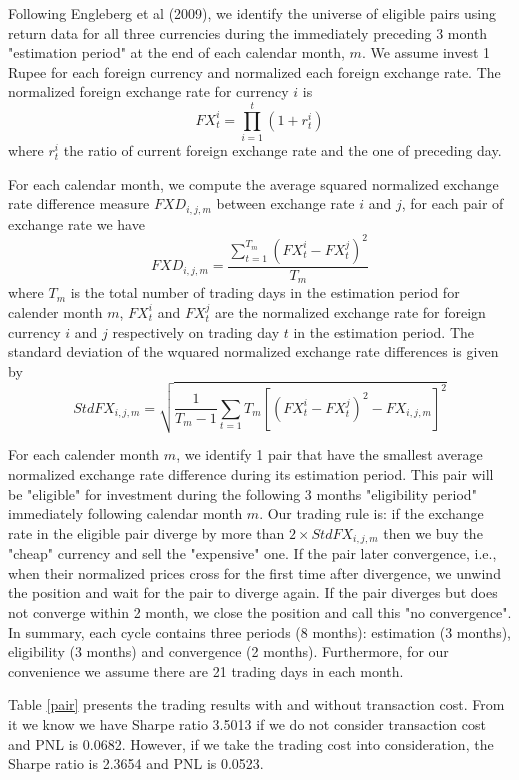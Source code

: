 \documentclass[11pt]{article}
\begin{document}
Following Engleberg et al (2009), we identify the universe of eligible pairs using return data for all three currencies during the immediately preceding 3 month "estimation period" at the end of each calendar month, $m$.  We assume invest 1 Rupee for each foreign currency and normalized each foreign exchange rate. The normalized foreign exchange rate  for currency $i$ is
\[
FX_t^i =\prod_{i=1}^t(1+r_t^i)
\]
where $r_t^i$ the ratio of current foreign exchange rate and the one of preceding day.

For each calendar month, we compute the average squared normalized exchange rate difference measure $FXD_{i,j,m}$ between exchange rate $i$ and $j$, for each pair of exchange rate we have
\[
FXD_{i,j,m}=\frac{\sum_{t=1}^{T_m}(FX_{t}^i-FX_{t}^j)^2}{T_m}
\]
where $T_m$ is the total number of trading days in the estimation period for calender month $m$, $FX_{t}^i$ and $FX_t^{j}$ are the normalized exchange rate for foreign currency $i$ and $j$ respectively on trading day $t$ in the estimation period. The standard deviation of the wquared normalized exchange rate differences is given by
\[
StdFX_{i,j,m}=\sqrt{\frac{1}{T_m-1}\sum_{t=1}{T_m}\left [(FX_t^i-FX_t^j)^2-FX_{i,j,m}\right]^2}
\]

For each calender month $m$, we identify 1 pair that have the smallest average normalized exchange rate difference during its estimation period. This pair will be "eligible" for investment during the following 3 months "eligibility period" immediately following calendar month $m$. Our trading rule is: if the exchange rate in the eligible pair diverge by more than $2\times StdFX_{i,j,m}$ then we buy the "cheap" currency and sell the "expensive" one. If the pair later convergence, i.e., when their normalized prices cross for the first time after divergence, we unwind the position and wait for the pair to diverge again. If the pair diverges but does not converge within 2 month, we close the position and call this "no convergence". In summary, each cycle contains three periods (8 months): estimation (3 months), eligibility (3 months) and convergence (2 months). Furthermore, for our convenience we assume there are 21 trading days in each month. 

Table \ref{pair} presents the trading results with and without transaction cost. From it we know we have Sharpe ratio 3.5013 if we do not consider transaction cost and PNL is 0.0682. However, if we take the trading cost into consideration, the Sharpe ratio is 2.3654 and PNL is 0.0523. 
\end{document}
